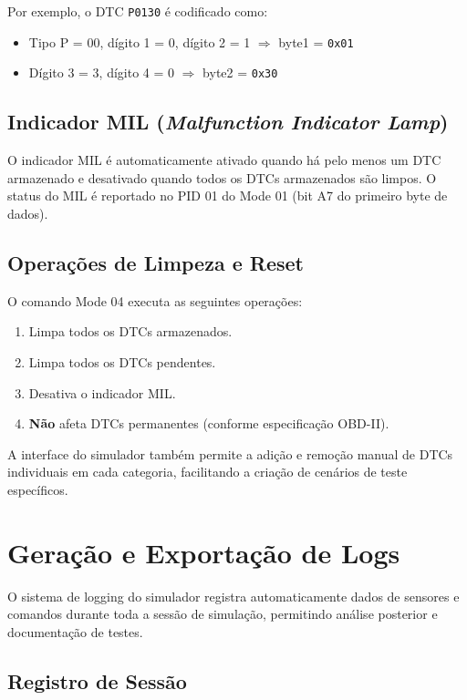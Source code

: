 Por exemplo, o DTC \texttt{P0130} é codificado como:
\begin{itemize}
    \item Tipo P = 00, dígito 1 = 0, dígito 2 = 1 $\Rightarrow$ byte1 = \texttt{0x01}
    \item Dígito 3 = 3, dígito 4 = 0 $\Rightarrow$ byte2 = \texttt{0x30}
\end{itemize}

\subsection{Indicador MIL (\textit{Malfunction Indicator Lamp})}

O indicador MIL é automaticamente ativado quando há pelo menos um DTC armazenado e desativado quando todos os DTCs armazenados são limpos. O status do MIL é reportado no PID 01 do Mode 01 (bit A7 do primeiro byte de dados).

\subsection{Operações de Limpeza e Reset}

O comando Mode 04 executa as seguintes operações:
\begin{enumerate}
    \item Limpa todos os DTCs armazenados.
    \item Limpa todos os DTCs pendentes.
    \item Desativa o indicador MIL.
    \item \textbf{Não} afeta DTCs permanentes (conforme especificação OBD-II).
\end{enumerate}

A interface do simulador também permite a adição e remoção manual de DTCs individuais em cada categoria, facilitando a criação de cenários de teste específicos.

\section{Geração e Exportação de Logs}
\label{sec:logs}

O sistema de logging do simulador registra automaticamente dados de sensores e comandos durante toda a sessão de simulação, permitindo análise posterior e documentação de testes.

\subsection{Registro de Sessão}

